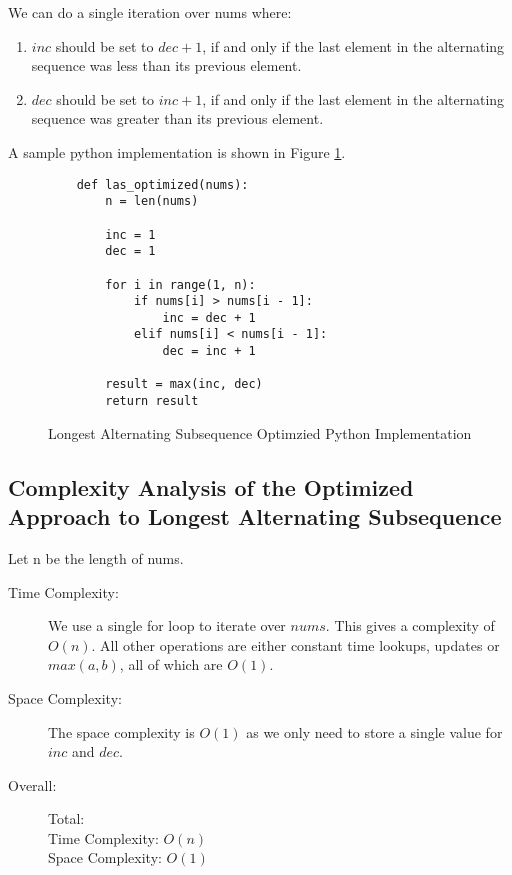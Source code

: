We can do a single iteration over nums where:

\begin{enumerate}
    \item $inc$ should be set to $dec + 1$, if and only if the last element in the alternating sequence was less than its previous element.
    
    \item $dec$ should be set to $inc + 1$, if and only if the last element in the alternating sequence was greater than its previous element.

\end{enumerate}

A sample python implementation is shown in Figure \ref{fig:las-optimized}.

\begin{figure}[H]
    \centering
    \begin{lstlisting}
    def las_optimized(nums):
        n = len(nums)
    
        inc = 1
        dec = 1
    
        for i in range(1, n):
            if nums[i] > nums[i - 1]:
                inc = dec + 1
            elif nums[i] < nums[i - 1]:
                dec = inc + 1
    
        result = max(inc, dec)
        return result
    \end{lstlisting}
    \caption{Longest Alternating Subsequence Optimzied Python Implementation}
    \label{fig:las-optimized}
\end{figure}

\subsection{Complexity Analysis of the Optimized Approach to Longest Alternating Subsequence}
Let n be the length of nums.

\begin{description}
    \item[Time Complexity:]
        We use a single for loop to iterate over $nums$.
        This gives a complexity of $O(n)$.
        All other operations are either constant time lookups,
        updates or $max(a,b)$, all of which are $O(1)$.
        
    \item[Space Complexity:] 
        The space complexity is $O(1)$ as we only need to store a single value for $inc$ and $dec$.

    \item[Overall:] Total:\\
        Time Complexity: $O(n)$\\
        Space Complexity: $O(1)$
    
\end{description}
